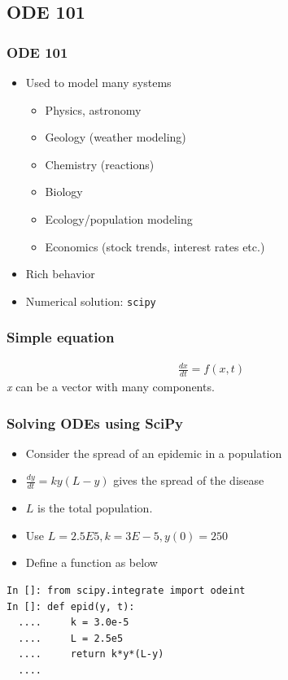 \documentclass[14pt,compress]{beamer}
\newcommand{\typ}[1]{\lstinline{#1}}
\begin{document}
\subsection{ODE 101}


\begin{frame}
  \frametitle{ODE 101}
  \begin{itemize}
    \item Used to model many systems
        \begin{itemize}
            \item Physics, astronomy
            \item Geology (weather modeling)
            \item Chemistry (reactions)
            \item Biology
            \item Ecology/population modeling
            \item Economics (stock trends, interest rates etc.)
        \end{itemize}
    \item Rich behavior
    \item Numerical solution: \typ{scipy}
 \end{itemize}
\end{frame}

\begin{frame}
  \frametitle{Simple equation}
\begin{align}
    \frac{dx}{dt} = f(x, t)
\end{align}
\emph{x} can be a vector with many components.
\end{frame}


\begin{frame}[fragile]
\frametitle{Solving ODEs using SciPy}
\begin{itemize}
\item Consider the spread of an epidemic in a population
\item $\frac{dy}{dt} = ky(L-y)$ gives the spread of the disease
\item $L$ is the total population.
\item Use $L = 2.5E5, k = 3E-5, y(0) = 250$
\item Define a function as below
\end{itemize}
\begin{lstlisting}
In []: from scipy.integrate import odeint
In []: def epid(y, t):
  ....     k = 3.0e-5
  ....     L = 2.5e5
  ....     return k*y*(L-y)
  ....
\end{lstlisting}
\end{frame}
\end{document}
